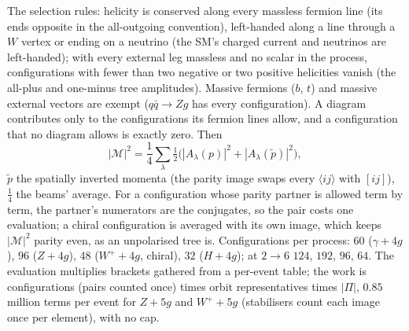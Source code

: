 \documentclass[11pt]{article}
\begin{document}
The selection rules: helicity is conserved along every massless fermion line (its ends opposite in the all-outgoing
convention), left-handed along a line through a $W$ vertex or ending on a neutrino (the SM's charged current and
neutrinos are left-handed); with every external leg massless and no scalar in the process, configurations with fewer
than two negative or two positive helicities vanish (the all-plus and one-minus tree amplitudes). Massive fermions
($b$, $t$) and massive external vectors are exempt ($q\bar q\to Zg$ has every configuration). A diagram contributes
only to the configurations its fermion lines allow, and a configuration that no diagram allows is exactly zero. Then
\begin{equation*}
  |\mathcal M|^2=\frac14\sum_{\lambda}\tfrac12\big(|A_\lambda(p)|^2+|A_\lambda(\tilde p)|^2\big),
\end{equation*}
$\tilde p$ the spatially inverted momenta (the parity image swaps every $\langle ij\rangle$ with $[ij]$), $\tfrac14$
the beams' average. For a configuration whose parity partner is allowed term by term, the partner's numerators are the
conjugates, so the pair costs one evaluation; a chiral configuration is averaged with its own image, which keeps
$|\mathcal M|^2$ parity even, as an unpolarised tree is. Configurations per process: $60$ ($\gamma+4g$), $96$ ($Z+4g$),
$48$ ($W^++4g$, chiral), $32$ ($H+4g$); at $2\to6$ $124$, $192$, $96$, $64$. The evaluation multiplies brackets
gathered from a per-event table; the work is configurations (pairs counted once) times orbit representatives times
$|\Pi|$, $0.85$ million terms per event for $Z+5g$ and $W^++5g$ (stabilisers count each image once per element), with no cap.
\end{document}
